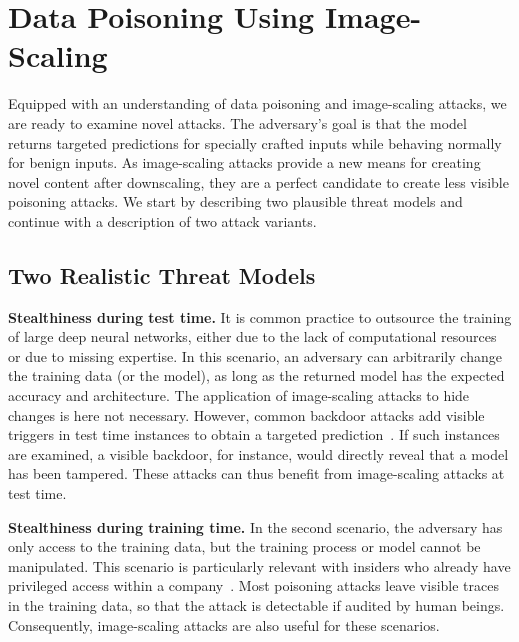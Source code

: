 \documentclass[conference]{IEEEtran}
\renewcommand{\paragraph}[1]{{\vskip 8pt \noindent\bf #1 }}
\begin{document}
\section{Data Poisoning Using Image-Scaling}
\label{sec:poisoning-scaling}
Equipped with an understanding of data poisoning and image-scaling 
attacks, we are ready to examine novel attacks.
The adversary's goal is that the {model\EndAccSupp{}} returns targeted predictions for 
specially crafted inputs while behaving normally for 
benign inputs. As image-scaling attacks provide a new {means\EndAccSupp{}} for 
creating novel content after downscaling, they are a perfect 
candidate to create less visible poisoning attacks.
We start by describing two plausible threat {models\EndAccSupp{}} and continue with a 
description of two attack variants.

\subsection{Two Realistic Threat Models}

\paragraph{Stealthiness during test time.}
It is common practice to outsource the training of large deep 
neural networks, either due to the lack of computational resources or 
due to missing expertise. 
In this {scenario\EndAccSupp{}}, an adversary can arbitrarily change the training data 
(or the model), as long as the returned model has the expected {accuracy\EndAccSupp{}} 
and architecture. The application of image-scaling attacks to hide 
changes is here not necessary. However, common backdoor attacks add 
visible triggers in test {time\EndAccSupp{}} instances to obtain a targeted 
prediction~\citep[e.g.][]{GuDolGar17,LiuMaAaf+18}. If such instances 
are examined, a visible backdoor, for instance, would directly reveal 
that a model has been tampered. These attacks can thus benefit from 
image-scaling attacks at test time.

\paragraph{Stealthiness during training time.} 
In the second scenario, the adversary has only access to the training 
data, but the training process or model cannot be manipulated. This 
scenario is particularly relevant with insiders who already have 
privileged access within a company~\citep{Sto15}.
Most poisoning attacks leave visible traces in the training data, so 
that the attack is detectable if audited by human beings. 
Consequently, image-scaling attacks are also useful for these scenarios.
\end{document}
